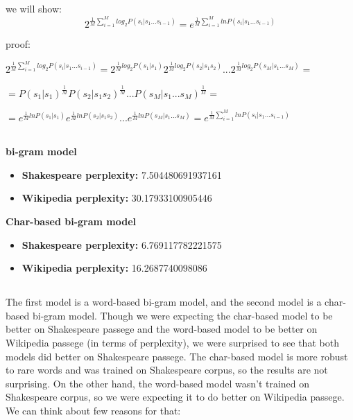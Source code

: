 \documentclass{article}
\begin{document}
\subsection{} %
we will show:
\begin{equation*}
    2^{\frac{1}{M}\sum_{i=1}^{M}log_2P(s_{i}|s_{1}...s_{i-1})} = e^{\frac{1}{M}\sum_{i=1}^{M}lnP(s_{i}|s_{1}...s_{i-1})}
\end{equation*}

proof:

$2^{\frac{1}{M}\sum_{i=1}^{M}log_2P(s_{i}|s_{1}...s_{i-1})} = 2^{\frac{1}{M}log_2P(s_{1}|s_{1})}  2^{\frac{1}{M}log_2P(s_{2}|s_{1}s_{2})} ... 2^{\frac{1}{M}log_2P(s_{M}|s_{1}...s_{M})} = $

$ = P(s_{1}|s_{1})^{\frac{1}{M}} P(s_{2}|s_{1}s_{2})^{\frac{1}{M}} ... P(s_{M}|s_{1}...s_{M})^{\frac{1}{M}} = $

$ = e^{\frac{1}{M}lnP(s_{1}|s_{1})} e^{\frac{1}{M}lnP(s_{2}|s_{1}s_{2})}  ...  e^{\frac{1}{M}lnP(s_{M}|s_{1}...s_{M})} = e^{\frac{1}{M}\sum_{i=1}^{M}lnP(s_{i}|s_{1}...s_{i-1})}$
\subsection{} %
\textbf{bi-gram model}
\begin{itemize}
\item \textbf{Shakespeare perplexity:} 7.504480691937161
\item \textbf{Wikipedia perplexity:} 30.17933100905446
\end{itemize}
\textbf{Char-based bi-gram model}
\begin{itemize}
\item \textbf{Shakespeare perplexity:} 6.769117782221575
\item \textbf{Wikipedia perplexity:} 16.2687740098086
\end{itemize}
\subsection{} %
The first model is a word-based bi-gram model, and the second model is a char-based bi-gram model.
Though we were expecting the char-based model to be better on Shakespeare passege
and the word-based model to be better on Wikipedia passege (in terms of perplexity),
we were surprised to see that both models did better on Shakespeare passege.
The char-based model is more robust to rare words and was trained on Shakespeare corpus, so
the results are not surprising. On the other hand, the word-based model wasn't trained on Shakespeare corpus,
so we were expecting it to do better on Wikipedia passege.
We can think about few reasons for that:
\end{document}
